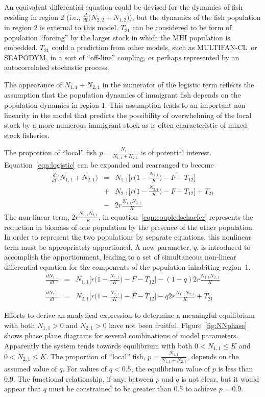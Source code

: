 \documentclass[12pt,letterpaper]{article}
\newcommand\SD{SEAPODYM}
\newcommand\MFCL{MULTIFAN-CL}
\newcommand\None{{N_{1,1}}}
\newcommand\Ntwo{{N_{2,1}}}
\newcommand\Nsum{{N_{1,1}+N_{2,1}}}
\begin{document}
An equivalent differential equation could be devised for the dynamics of
fish residing in region 2 
(i.e., $\frac{d}{dt}\big(N_{2,2}+N_{1,2}\big)$), but 
the dynamics of the fish population in region 2 is external to this
model. $T_{21}$ can be considered to be form of population ``forcing''
by the larger stock in which the MHI population is embedded. $T_{21}$
could a prediction from other models, such as \MFCL\ or \SD, in a sort of
``off-line'' coupling, or perhaps represented by an
autocorrelated stochastic process. 

The appearance of
$\Nsum$ in the numerator of the logistic term reflects the assumption
that the population dynamics of immigrant fish depends on
the population dynamics in region 1. This assumption leads to an
important non-linearity in the model that predicts the possibility of
overwhelming of the
local stock by a more numerous immigrant stock as is often characteristic of
mixed-stock fisheries.

The proportion of ``local'' fish $p = \frac{\None}{\Nsum}$ is of potential interest.
Equation~\ref{eqn:logistic} can be expanded and rearranged to become
\begin{eqnarray}
\label{eqn:coupledschaefer}
\frac{d}{dt}\big(\Nsum\big) &=&\None\Big[r\Big(1-\frac{\None}{K}\Big)
-F - T_{12}\Big] \nonumber\\
&+&\Ntwo\Big[r\Big(1-\frac{\Ntwo}{K}\Big)
-F - T_{12}\Big]  + T_{21}\\
&-& 2r\frac{\None\Ntwo}{K}\nonumber
\end{eqnarray}
The non-linear term, $2r\frac{\None\Ntwo}{K}$, in
equation~\ref{eqn:coupledschaefer} represents the reduction in biomass
of one population by the presence of the other population.
In order to represent
the two populations by separate equations, this
nonlinear term must be appropriately apportioned.
A new parameter, $q$, is introduced to accomplish the apportionment,
leading to a set of simultaneous non-linear differential equation for the
components of the population inhabiting region~1.
\begin{eqnarray}
\label{eqn:coupledschaeferq}
\frac{d\None}{dt}&=&\None\Big[r\Big(1-\frac{\None}{K}\Big)
-F - T_{12}\Big] - (1-q)2r\frac{\None\Ntwo}{K}\nonumber\\
\\
\frac{d\Ntwo}{dt}&=&\Ntwo\Big[r\Big(1-\frac{\Ntwo}{K}\Big)
-F - T_{12}\Big] - q2r\frac{\None\Ntwo}{K} + T_{21}\nonumber
\end{eqnarray}

Efforts to derive an analytical expression to determine 
a meaningful equilibrium 
with both $\None > 0$ and $\Ntwo > 0$ 
have not been fruitful.
Figure~\ref{fig:NNphase} shows phase plane diagrams for several
combinations of model parameters. Apparently the system tends towards
equilibrium with both $0 < \None \le K$ and $0 < \Ntwo \le K$.
The proportion of ``local'' fish, $p = \frac{\None}{\Nsum}$, depends on
the assumed value of $q$. For values of $q < 0.5$, the equilibrium
value of $p$ is less than 0.9. The functional relationship, if any,
between $p$ and $q$ is not clear, but it would appear that $q$ must be
constrained to be greater than 0.5 to achieve $p=0.9$.
\end{document}
